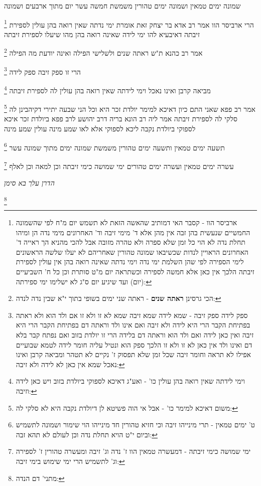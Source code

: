 \documentclass[12pt, openany]{book}
\newcommand{\footnotecomment}[1]{
	\renewcommand\thefootnote{}
	\footnote{#1}}
\newcommand{\commenta}[1]{\footnotecomment{#1}}
\begin{document}
{שמונה ימים טמאין ושמונה ימים טהורין משמשת חמשה עשר יום מתוך ארבעים ושמונה 
\commenta{ארביסר הוו - קסבר האי דמותיב שהאשה הזאת לא תשמש יום מ"ח לפי שהשמונה החמשיים שנעשית בהן זבה אין מהן אלא ד' מימי זיבה וד' האחרונים מימי נדה הן ומיהו תחלת נדה לא הוי כל זמן שלא ספרה ולא טהרה מזובה אבל להכי מהניא הך ראייה ד' האחרונים הראויין לנדות שכשיבאו שמונה טהורין שאחריהם לא יעלו שלשה הראשונים לימי הספירה לפי שהן השלמת ימי נדה וימי נדתה שאינה רואה בהן אין עולין לספירת זיבתה הלכך אין כאן אלא חמשה לספירה וכשתראה יום מ"ט סותרת וכן כל ח' השביעיים (יום) ועד שיגיע יום ס"ג לא ישלימו ימי ספירתה:}
הרי ארביסר הוו 
אמר רב אדא בר יצחק זאת אומרת ימי נדתה שאין רואה בהן עולין לספירת זיבתה דאיבעיא להו
ימי לידה שאינה רואה בהן מהו שיעלו לספירת זיבתה 
\commenta{הכי גרסינן \textbf{ראתה שנים} - ראתה שני ימים בשופי בתוך י"א שבין נדה לנדה:}
אמר רב כהנא ת"ש ראתה שנים ולשלישי הפילה ואינה יודעת מה הפילה
\commenta{ספק לידה ספק זיבה - שמא לידה שמא זיבה שמא לא זו ולא זו אם ולד הוא ולא ראתה בפתיחת הקבר הרי היא לידה ולא זיבה ואם אינו ולד וראתה דם בפתיחת הקבר הרי היא זיבה ואין כאן לידה ואם ולד הוא וראתה דם בלידה הרי זו יולדת בזוב ואם נפתח קבר בלא דם ואינו ולד אין כאן לא זו ולא זו הלכך ספק הוא ונטיל עליה חומר לידה לטמא שבועיים אפילו לא תראה וחומר זיבה שכל זמן שלא תפסוק ז' נקיים לא תטהר ומביאה קרבן ואינו נאכל שמא אין כאן לא לידה ולא זיבה:}
הרי זו ספק זיבה ספק לידה 
\commenta{וימי לידתה שאין רואה בהן עולין כו' - ואע"ג דאיכא לספוקי ביולדת בזוב ויש כאן לידה וזיבה:}
מביאה קרבן ואינו נאכל וימי לידתה שאין רואה בהן עולין לה לספירת זיבתה 
\commenta{משום דאיכא למימר כו' - אבל אי הוה פשיטא לן דיולדת נקבה היא לא סלקי לה:}
אמר רב פפא שאני התם כיון דאיכא למימר יולדת זכר היא וכל הני שבעה יתירי דקיהבינן לה סלקי לה לספירת זיבתה 
אמר ליה רב הונא בריה דרב יהושע לרב פפא ביולדת זכר איכא לספוקי ביולדת נקבה ליכא לספוקי אלא לאו שמע מינה עולין שמע מינה 
\commenta{ט' ימים טמאין - תרי מינייהו זיבה וכי חזיא טהורין חד מינייהו הוי שימור ושמונה לתשמיש וביום י"ט הויא תחלת נדה וכן לעולם לא תהא זבה:}
תשעה ימים טמאין ותשעה ימים טהורין משמשת שמונה ימים מתוך שמונה עשר 
\commenta{ימי שמושה כימי זיבתה - דמעשרה טמאין הוו ז' נדה וג' זיבה ומעשרה טהורין ז' לספירה וג' לתשמיש הרי ימי שימוש בימי זיבה:}
עשרה ימים טמאין ועשרה ימים טהורים ימי שמושה כימי זיבתה וכן למאה וכן לאלף
\par \par {\large\emph{הדרן עלך בא סימן}}\par \par 
\commenta{מתני' דם הנדה:}

}
\end{document}
